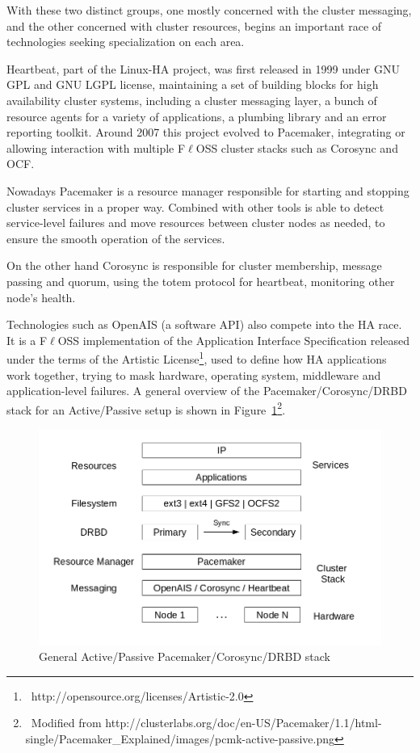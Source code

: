 \documentclass[a4paper, 12pt]{book}
\begin{document}
\noindent With these two distinct groups, one mostly concerned with the cluster messaging, and the other concerned with cluster resources, begins an important race of technologies seeking specialization on each area.\bigskip

\noindent Heartbeat, part of the Linux-HA project, was first released in 1999 under GNU GPL and GNU LGPL license, maintaining a set of building blocks for high availability cluster systems, including a cluster messaging layer, a bunch of resource agents for a variety of applications, a plumbing library and an error reporting toolkit. Around 2007 this project evolved to Pacemaker, integrating or allowing interaction with multiple F$\ell$OSS cluster stacks such as Corosync and OCF.\bigskip

\noindent Nowadays Pacemaker is a resource manager responsible for starting and stopping cluster services in a proper way. Combined with other tools is able to detect service-level failures and move resources between cluster nodes as needed, to ensure the smooth operation of the services.\bigskip


\noindent On the other hand Corosync is responsible for cluster membership, message passing and quorum, using the totem protocol 
for heartbeat, monitoring other node's health.

\noindent Technologies such as OpenAIS (a software API) also compete into the HA race. It is a F$\ell$OSS implementation of the Application Interface Specification released under the terms of the Artistic License\footnote{{\tiny\  http://opensource.org/licenses/Artistic-2.0}}, used to define how HA applications work together, trying to mask hardware, operating system, middleware and application-level failures. A general overview of the Pacemaker/Corosync/DRBD stack for an Active/Passive setup is shown in Figure~\ref{fig:stack}\footnote{\tiny\ Modified from http://clusterlabs.org/doc/en-US/Pacemaker/1.1/html-single/Pacemaker\_Explained/images/pcmk-active-passive.png}.

\FloatBarrier
\begin{figure}[H]
  \centering
  \includegraphics[scale=1]{pacemaker-stack.png}
  \caption[General Active/Passive Pacemaker/Corosync/DRBD stack]{General Active/Passive Pacemaker/Corosync/DRBD stack}
  \label{fig:stack}
\end{figure}
\end{document}
